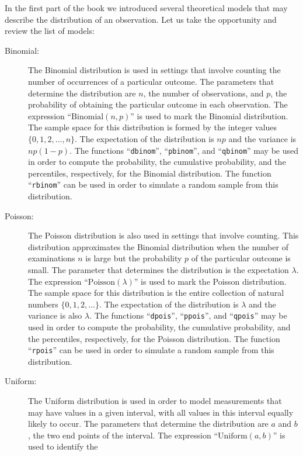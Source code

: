 \documentclass[]{krantz}
\theoremstyle{definition}
\theoremstyle{definition}
\theoremstyle{definition}
\theoremstyle{remark}
\begin{document}
In the first part of the book we introduced several theoretical models
that may describe the distribution of an observation. Let us take the
opportunity and review the list of models:

\begin{description}
\item[Binomial:]
The Binomial distribution is used in settings that involve counting
the number of occurrences of a particular outcome. The parameters
that determine the distribution are \(n\), the number of observations,
and \(p\), the probability of obtaining the particular outcome in each
observation. The expression ``\(\mathrm{Binomial}(n,p)\)'' is used to
mark the Binomial distribution. The sample space for this
distribution is formed by the integer values
\(\{0, 1, 2, \ldots, n\}\). The expectation of the distribution is
\(np\) and the variance is \(np(1-p)\). The functions ``\texttt{dbinom}'',
``\texttt{pbinom}'', and ``\texttt{qbinom}'' may be used in order to compute the
probability, the cumulative probability, and the percentiles,
respectively, for the Binomial distribution. The function ``\texttt{rbinom}''
can be used in order to simulate a random sample from this
distribution.
\item[Poisson:]
The Poisson distribution is also used in settings that involve
counting. This distribution approximates the Binomial distribution
when the number of examinations \(n\) is large but the probability \(p\)
of the particular outcome is small. The parameter that determines
the distribution is the expectation \(\lambda\). The expression
``\(\mathrm{Poisson}(\lambda)\)'' is used to mark the Poisson
distribution. The sample space for this distribution is the entire
collection of natural numbers \(\{0, 1, 2, \ldots\}\). The expectation
of the distribution is \(\lambda\) and the variance is also \(\lambda\).
The functions ``\texttt{dpois}'', ``\texttt{ppois}'', and ``\texttt{qpois}'' may be used in
order to compute the probability, the cumulative probability, and
the percentiles, respectively, for the Poisson distribution. The
function ``\texttt{rpois}'' can be used in order to simulate a random sample
from this distribution.
\item[Uniform:]
The Uniform distribution is used in order to model measurements that
may have values in a given interval, with all values in this
interval equally likely to occur. The parameters that determine the
distribution are \(a\) and \(b\), the two end points of the interval.
The expression ``\(\mathrm{Uniform}(a,b)\)'' is used to identify the

\end{description}
\end{document}
